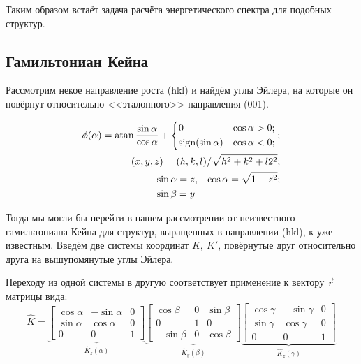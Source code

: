 \documentclass[../main.tex]{subfiles}
\newcommand{\sign}{\text{sign}}
\begin{document}
    Таким образом встаёт задача расчёта энергетического спектра для подобных структур.

    \subsection{Гамильтониан Кейна}

    Рассмотрим некое направление роста (hkl) и найдём углы Эйлера, на которые он повёрнут
    относительно <<эталонного>> направления (001).

    \begin{eqnarray}
        \phi(\alpha) = \atan \frac{\sin \alpha}{\cos \alpha} + 
            \left\{ \begin{aligned}
                        &0 & \cos \alpha > 0;\\
                        &\sign(\sin \alpha) & \cos \alpha < 0;
                    \end{aligned}\right.;\\
        (x, y, z) = (h, k, l) / \sqrt{h^2 + k^2 + l2^2};\\
        \begin{aligned}
            &\sin \alpha  = z, & \cos \alpha = \sqrt{1 - z^2};\\
            &\sin \beta  = y
        \end{aligned}
    \end{eqnarray}

    Тогда мы могли бы перейти в нашем рассмотрении от неизвестного гамильтониана Кейна
    для структур, выращенных в направлении (hkl), к уже известным. Введём две системы 
    координат $K,~K'$, повёрнутые друг относительно друга на вышупомянутые углы Эйлера. 

    Переходу из одной системы в другую соответствует применение к вектору
    $\vec r$ матрицы вида:
    \begin{equation}
        \hat K =
        \underbrace{
            \begin{bmatrix}
                \cos \alpha & -\sin \alpha  &   0\\
                \sin \alpha & \cos \alpha   &   0\\
                0           & 0             &   1
            \end{bmatrix}
        }_{\hat{K}_z(\alpha)}
        \underbrace{
            \begin{bmatrix}
                \cos \beta  & 0             &   \sin \beta \\
                0           & 1             &   0\\
                -\sin \beta & 0             &   \cos \beta
            \end{bmatrix}
        }_{\hat{K}_y(\beta)}
        \underbrace{
            \begin{bmatrix}
                \cos \gamma & -\sin \gamma  &   0\\
                \sin \gamma & \cos \gamma   &   0\\
                0           & 0             &   1
            \end{bmatrix}
        }_{\hat{K}_z(\gamma)}
    \end{equation}
\end{document}
